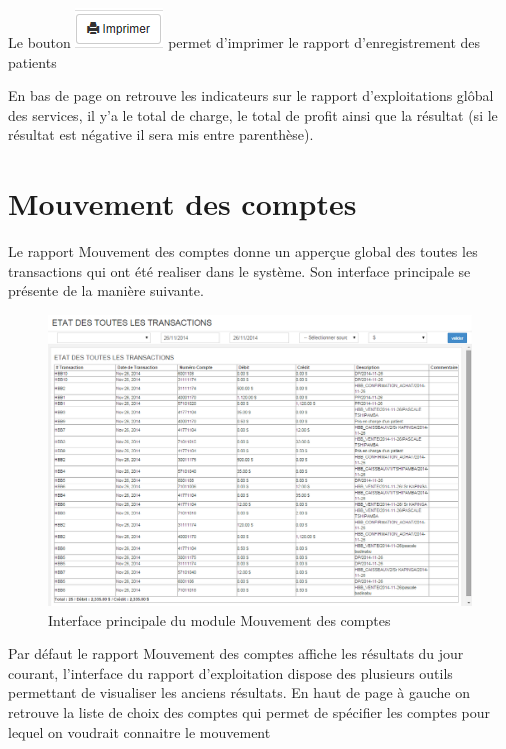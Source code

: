 \documentclass[12pt,a4paper]{report}
\begin{document}
Le bouton \includegraphics[scale=0.7]{pic/Print.png} permet d'imprimer le rapport d'enregistrement des patients

En bas de page on retrouve les indicateurs sur le rapport d'exploitations glôbal des services, il y'a le total de charge, le total de profit ainsi que la résultat (si le résultat est négative il sera mis entre parenthèse). 

\newpage
\section{Mouvement des comptes}
Le rapport Mouvement des comptes donne un apperçue global des toutes les transactions qui ont été realiser dans le système. Son interface principale se présente de la manière suivante. 

\begin{figure}[h]
\begin{center}
\includegraphics[width=14cm]{pic/EtatToutesTrans.png}
\end{center}
\caption{Interface principale du module Mouvement des comptes}
\label{Interface principale du module Mouvement des comptes}
\end{figure}

Par défaut le rapport Mouvement des comptes affiche les résultats du jour courant, l'interface du rapport d'exploitation dispose des plusieurs outils permettant de visualiser les anciens résultats. En haut de page à gauche on retrouve la liste de choix des comptes qui permet de spécifier les comptes pour lequel on voudrait connaitre le mouvement
\end{document}
